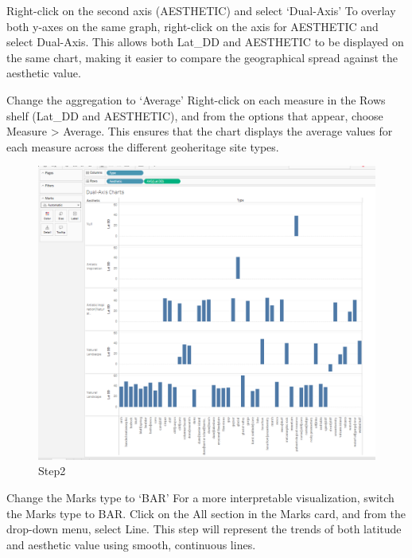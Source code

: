 \documentclass[
  letterpaper,
  DIV=11,
  numbers=noendperiod]{scrreprt}
\begin{document}
Right-click on the second axis (AESTHETIC) and select `Dual-Axis' To
overlay both y-axes on the same graph, right-click on the axis for
AESTHETIC and select Dual-Axis. This allows both Lat\_DD and AESTHETIC
to be displayed on the same chart, making it easier to compare the
geographical spread against the aesthetic value.

Change the aggregation to `Average' Right-click on each measure in the
Rows shelf (Lat\_DD and AESTHETIC), and from the options that appear,
choose Measure \textgreater{} Average. This ensures that the chart
displays the average values for each measure across the different
geoheritage site types.

\begin{figure}[H]

{\centering \includegraphics{Step2_DAC.png}

}

\caption{Step2}

\end{figure}%

Change the Marks type to `BAR' For a more interpretable visualization,
switch the Marks type to BAR. Click on the All section in the Marks
card, and from the drop-down menu, select Line. This step will represent
the trends of both latitude and aesthetic value using smooth, continuous
lines.
\end{document}
